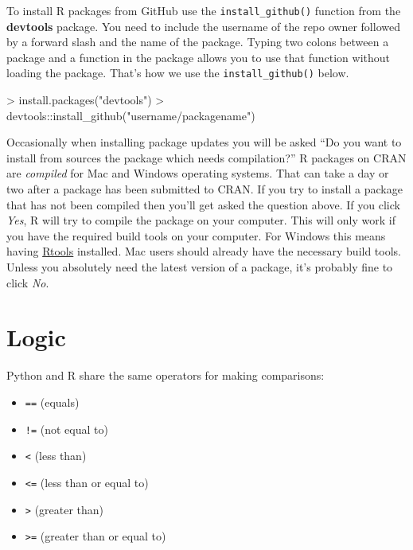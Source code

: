 \documentclass[
]{book}
\newenvironment{Shaded}{\begin{snugshade}}{\end{snugshade}}
\newcommand{\FunctionTok}[1]{\textcolor[rgb]{0.00,0.00,0.00}{#1}}
\newcommand{\NormalTok}[1]{#1}
\newcommand{\SpecialCharTok}[1]{\textcolor[rgb]{0.00,0.00,0.00}{#1}}
\newcommand{\StringTok}[1]{\textcolor[rgb]{0.31,0.60,0.02}{#1}}
\providecommand{\tightlist}{%
  \setlength{\itemsep}{0pt}\setlength{\parskip}{0pt}}
\begin{document}
To install R packages from GitHub use the \texttt{install\_github()} function from the \textbf{devtools} package. You need to include the username of the repo owner followed by a forward slash and the name of the package. Typing two colons between a package and a function in the package allows you to use that function without loading the package. That's how we use the \texttt{install\_github()} below.

\begin{Shaded}
\begin{Highlighting}[]
\SpecialCharTok{\textgreater{}} \FunctionTok{install.packages}\NormalTok{(}\StringTok{"devtools"}\NormalTok{)}
\SpecialCharTok{\textgreater{}}\NormalTok{ devtools}\SpecialCharTok{::}\FunctionTok{install\_github}\NormalTok{(}\StringTok{"username/packagename"}\NormalTok{)}
\end{Highlighting}
\end{Shaded}

Occasionally when installing package updates you will be asked ``Do you want to install from sources the package which needs compilation?'' R packages on CRAN are \emph{compiled} for Mac and Windows operating systems. That can take a day or two after a package has been submitted to CRAN. If you try to install a package that has not been compiled then you'll get asked the question above. If you click \emph{Yes}, R will try to compile the package on your computer. This will only work if you have the required build tools on your computer. For Windows this means having \href{https://cran.r-project.org/bin/windows/Rtools/}{Rtools} installed. Mac users should already have the necessary build tools. Unless you absolutely need the latest version of a package, it's probably fine to click \emph{No}.

\hypertarget{logic}{%
\section{Logic}\label{logic}}

Python and R share the same operators for making comparisons:

\begin{itemize}
\tightlist
\item
  \texttt{==} (equals)
\item
  \texttt{!=} (not equal to)
\item
  \texttt{\textless{}} (less than)
\item
  \texttt{\textless{}=} (less than or equal to)
\item
  \texttt{\textgreater{}} (greater than)
\item
  \texttt{\textgreater{}=} (greater than or equal to)
\end{itemize}
\end{document}
